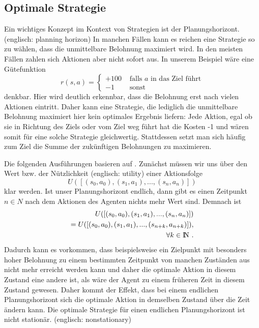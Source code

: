 \documentclass[a4paper]{IEEEtran}
\def\IN{\mathrm{I\hspace{-2pt}N}} %
\begin{document}
\subsection{Optimale Strategie}
Ein wichtiges Konzept im Kontext von Strategien ist der Planungshorizont. (englisch: planning horizon) In manchen Fällen kann es reichen eine Strategie so zu wählen, dass die unmittelbare Belohnung maximiert wird. In den meisten Fällen zahlen sich Aktionen aber nicht sofort aus. In unserem Beispiel wäre eine Gütefunktion
\begin{equation}
	r(s,a) = \left\{ \begin{array}{rl}
		+100 &\mbox{ falls $a$ in das Ziel führt} \\
		-1 &\mbox{ sonst}
       \end{array} \right.
\end{equation}
denkbar. Hier wird deutlich erkennbar, dass die Belohnung erst nach vielen Aktionen eintritt. Daher kann eine Strategie, die lediglich die unmittelbare Belohnung maximiert hier kein optimales Ergebnis liefern: Jede Aktion, egal ob sie in Richtung des Ziels oder vom Ziel weg führt hat die Kosten -1 und wären somit für eine solche Strategie gleichwertig.
Stattdessen setzt man sich häufig zum Ziel die Summe der zukünftigen Belohnungen zu maximieren.

Die folgenden Ausführungen basieren auf \cite{russell1995artificial}. Zunächst müssen wir uns über den Wert bzw. der Nützlichkeit (englisch: utility) einer Aktionsfolge 
\begin{equation}
	U([(s_0, a_0), (s_1, a_1), ..., (s_n, a_n)])
\end{equation}
klar werden. Ist unser Planungshorizont endlich, dann gibt es einen Zeitpunkt $n \in N$ nach dem Aktionen des Agenten nichts mehr Wert sind. Demnach ist 
\begin{equation}
	\begin{split}
		U([ (s_0, a_0), (s_1, a_1), ..., (s_n, a_n)]) \\
		= U([ (s_0, a_0), (s_1, a_1), ..., (s_{n+k}, a_{n+k})]),\\
		\forall k \in \IN \ .
	\end{split}
\end{equation}
Dadurch kann es vorkommen, dass beispielsweise ein Zielpunkt mit besonders hoher Belohnung zu einem bestimmten Zeitpunkt von manchen Zuständen aus nicht mehr erreicht werden kann und daher die optimale Aktion in diesem Zustand eine andere ist, als wäre der Agent zu einem früheren Zeit in diesem Zustand gewesen. Daher kommt der Effekt, dass bei einem endlichen Planungshorizont sich die optimale Aktion in demselben Zustand über die Zeit ändern kann. Die optimale Strategie für einen endlichen Planungshorizont ist nicht stationär. (englisch: nonstationary)
\end{document}
